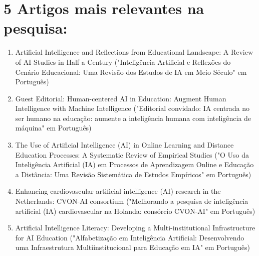 \documentclass{article}
\begin{document}
\section{5 Artigos mais relevantes na pesquisa:}

\begin{enumerate}
    \item Artificial Intelligence and Reflections from Educational Landscape: A Review of AI Studies in Half a Century ("Inteligência Artificial e Reflexões do Cenário Educacional: Uma Revisão dos Estudos de IA em Meio Século" em Português)

    \item Guest Editorial: Human-centered AI in Education: Augment Human Intelligence with Machine Intelligence ("Editorial convidado: IA centrada no ser humano na educação: aumente a inteligência humana com inteligência de máquina" em Português)
    
    \item The Use of Artificial Intelligence (AI) in Online Learning and Distance Education Processes: A Systematic Review of Empirical Studies ("O Uso da Inteligência Artificial (IA) em Processos de Aprendizagem Online e Educação a Distância: Uma Revisão Sistemática de Estudos Empíricos" em Português)
    
    \item Enhancing cardiovascular artificial intelligence (AI) research in the Netherlands: CVON-AI consortium ("Melhorando a pesquisa de inteligência artificial (IA) cardiovascular na Holanda: consórcio CVON-AI" em Português)
    
    \item Artificial Intelligence Literacy: Developing a Multi-institutional Infrastructure for AI Education ("Alfabetização em Inteligência Artificial: Desenvolvendo uma Infraestrutura Multiinstitucional para Educação em IA" em Português)
    
\end{enumerate}
\end{document}
